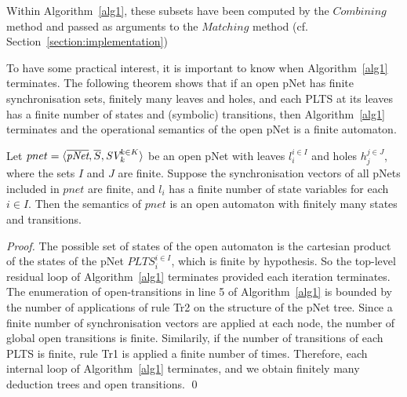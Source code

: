 \documentclass[smallcondensed]{svjour3}
\newcommand{\TODO}[1]{\textcolor{red}{\textbf{[TODO:#1]}}}
\newcommand{\Pred}{\symb{Pred}}
\begin{document}


Within Algorithm~\ref{alg1}, these subsets have been computed by the
$Combining$ method and passed as arguments to the $Matching$ method
(cf. Section~\ref{section:implementation}) 

To have some practical interest, it is important to know when Algorithm~\ref{alg1} terminates. The following theorem shows that if an open pNet
has finite synchronisation sets, finitely many leaves and
holes, and each PLTS at its leaves has a finite number of states and
(symbolic) transitions, then Algorithm~\ref{alg1} terminates and the operational semantics of the open pNet is a finite automaton. 


\medskip
\begin{theorem}[Finiteness]\cite{henrio:Forte2016}
	Let $pnet=\langle \overline{\pNet},\overline{S}, \symb{SV}_k^{k\in K}\rangle$ be an open pNet  with leaves $l_i^{i\in I}$ and holes $h_j^{j\in
		J}$, where the sets $I$ and $J$ are finite. Suppose the synchronisation vectors of all pNets 
	included in  $pnet$   are finite, and 
	$l_i $ has a finite number of state variables for each $i\in I$. Then the semantics of $pnet$ is an open automaton 
	with finitely many states and transitions.
\end{theorem}
\begin{proof}
  The possible set of states of the open automaton is the cartesian
  product of the states of the pNet $PLTS_i^{i\in I}$, which is finite by
  hypothesis. So the top-level residual loop of Algorithm~\ref{alg1} terminates provided each 
  iteration terminates. The enumeration of open-transitions in line 5 of Algorithm~\ref{alg1} is bounded by the
  number of applications of rule Tr2 on the structure of the
  pNet tree. Since a finite number of synchronisation vectors are applied
  at each node, the number of global open transitions is finite. Similarily, if the number
  of transitions of each PLTS is finite, rule Tr1 is 
  applied a finite number of times. Therefore, each internal loop of Algorithm~\ref{alg1} terminates, and we obtain finitely many deduction trees and
  open transitions.
  \hfill \qed
  \end{proof}
\end{document}
